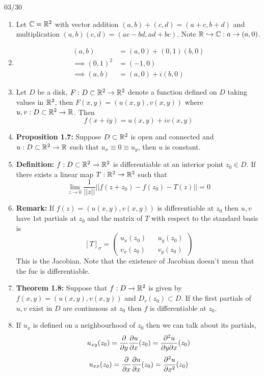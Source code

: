 \documentclass[12pt]{article}
\begin{document}


$03/30$

\begin{enumerate}
    \item Let $\mathbb C = \mathbb R^2$ with vector addition $(a,b) + (c,d) = (a+c, b+d)$ and multiplication $(a,b)(c,d) = (ac-bd, ad+bc)$. Note $\mathbb R \hookrightarrow \mathbb C : a \to (a, 0)$. 
    
    \item \begin{align*}
        (a,b) &= (a,0) + (0,1)(b,0) \\ 
        \implies (0,1)^2 &= (-1,0) \\ 
        \implies (a,b) &= (a,0) + i(b,0)
    \end{align*}
    \item Let $D$ be a disk, $F: D \subset \mathbb R^2 \to \mathbb R^2$ denote a function defined on $D$ taking values in $\mathbb R^2$, then $F(x,y) = (u(x,y), v(x,y))$ where $u, v : D \subset \mathbb R^2 \to \mathbb R$. Then \[f(x + iy) = u(x,y) + iv(x,y)\]
    
    \item \textbf{Proposition 1.7:} Suppose $D \subset \mathbb R^2$ is open and connected and $u : D \subset \mathbb R^2 \to \mathbb R$ such that $u_x \equiv 0 \equiv u_y$, then $u$ is constant.
    
    \item \textbf{Definition:} $f : D \subset \mathbb R^2 \to \mathbb R^2$ is differentiable at an interior point $z_0 \in D$. If there exists a linear map $T : \mathbb R^2 \to \mathbb R^2$ such that 
    \[\lim_{z\to 0} \frac{1}{||z||}||f(z+z_0) - f(z_0) - T(z)|| = 0\]

    \item \textbf{Remark:} If $f(z) = (u(x,y), v(x,y))$ is differentiable at $z_0$ then $u,v$ have $1$st partials at $z_0$ and the matrix of $T$ with respect to the standard basis is \[[T]_\sigma = \begin{pmatrix}
        u_x(z_0) && u_y(z_0) \\ v_x(z_0) && v_y(z_0)
    \end{pmatrix}\]
    This is the Jacobian. Note that the existence of Jacobian doesn't mean that the fuc is differentiable. 

    \item \textbf{Theorem 1.8:} Suppose that $f: D \to \mathbb R^2$ is given by $f(x,y) = (u(x,y), v(x,y))$ and $D_r(z_0) \subset D$. If the first partials of $u, v$ exist in $D$ are continuous at $z_0$ then $f$ is differentiable at $z_0$. 
    
    \item If $u_x$ is defined on a neighbourhood of $z_0$ then we can talk about its partials, 
    \[u_{xy}(z_0) = \frac{\partial}{\partial y}\frac{\partial u}{\partial x} (z_0) = \frac{\partial^2u}{\partial y \partial x} (z_0) \]
    \[u_{xx}(z_0) = \frac{\partial}{\partial x}\frac{\partial u}{\partial x} (z_0) = \frac{\partial^2u}{\partial x^2} (z_0) \]


\end{enumerate}
\end{document}
